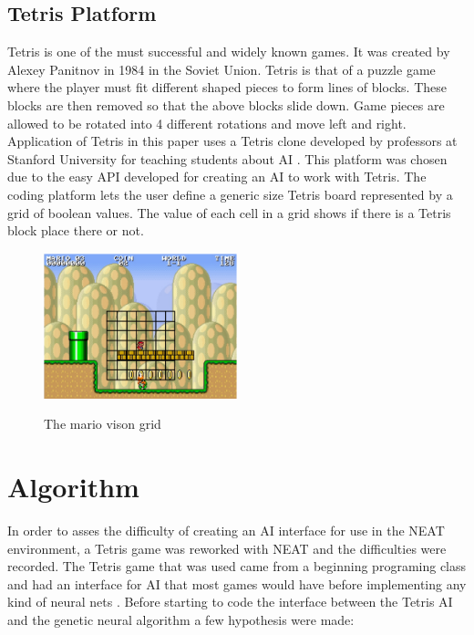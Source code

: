 \documentclass[12pt]{ucthesis} \newif\ifpdf \ifx\pdfoutput\undefined
\begin{document}
\section{Tetris Platform}

Tetris is one of the must successful and widely known games. It was created by
Alexey Panitnov in 1984 in the Soviet Union. Tetris is that of a
puzzle game where the player must fit different shaped pieces to form lines of blocks.
These blocks are then removed so that the above blocks slide down. Game pieces
are allowed to be rotated into 4 different rotations and move left and right.
Application of Tetris in this paper uses a Tetris clone developed by professors
at Stanford University for teaching students about AI \cite{tetris}. This
platform was chosen due to the easy API developed for creating an AI to work with Tetris. The coding platform
lets the user define a generic size Tetris board represented by a grid of boolean
values. The value of each cell in a grid shows if there is a Tetris block place
there or not.

\begin{figure}[h!] 
\caption{The mario vison grid}
  \centering
    \includegraphics[width=0.5\textwidth]{mariogrid.png}
   \label{fig:mariogrid} 
\end{figure}

\chapter{Algorithm}

In order to asses the difficulty of creating an AI interface for use in the NEAT
environment, a Tetris game was reworked with NEAT and the difficulties were
recorded. The Tetris game that was used came from a beginning programing class
and had an interface for AI that most games would have before implementing any
kind of neural nets \cite{tetris}. Before starting to code the interface between
the Tetris AI and the genetic neural algorithm a few hypothesis were made:
\end{document}
